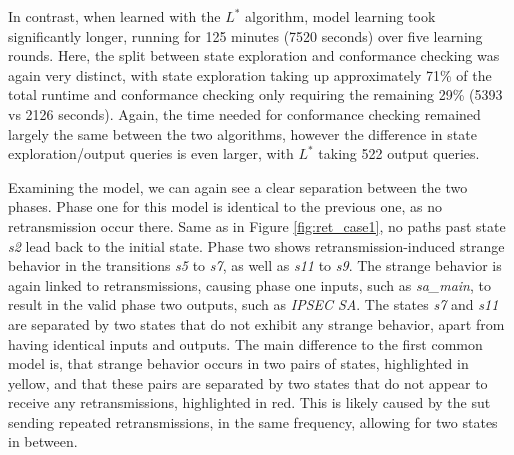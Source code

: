 In contrast, when learned with the $L^*$ algorithm, model learning took significantly longer, running for 125 minutes (7520 seconds) over five learning rounds. Here, the split between state exploration and conformance checking was again very distinct, with state exploration taking up approximately 71\% of the total runtime and conformance checking only requiring the remaining 29\% (5393 vs 2126 seconds). Again, the time needed for conformance checking remained largely the same between the two algorithms, however the difference in state exploration/output queries is even larger, with $L^*$ taking 522 output queries.

Examining the model, we can again see a clear separation between the two phases. Phase one for this model is identical to the previous one, as no retransmission occur there. Same as in Figure \ref{fig:ret_case1}, no paths past state \emph{s2} lead back to the initial state. Phase two shows retransmission-induced strange behavior in the transitions \emph{s5} to \emph{s7}, as well as \emph{s11} to \emph{s9}. The strange behavior is again linked to retransmissions, causing phase one inputs, such as \emph{sa\_main}, to result in the valid phase two outputs, such as \emph{IPSEC SA}. The states \emph{s7} and \emph{s11} are separated by two states that do not exhibit any strange behavior, apart from having identical inputs and outputs. The main difference to the first common model is, that strange behavior occurs in two pairs of states, highlighted in yellow, and that these pairs are separated by two states that do not appear to receive any retransmissions, highlighted in red. This is likely caused by the \ac{sut} sending repeated retransmissions, in the same frequency, allowing for two states in between. 

